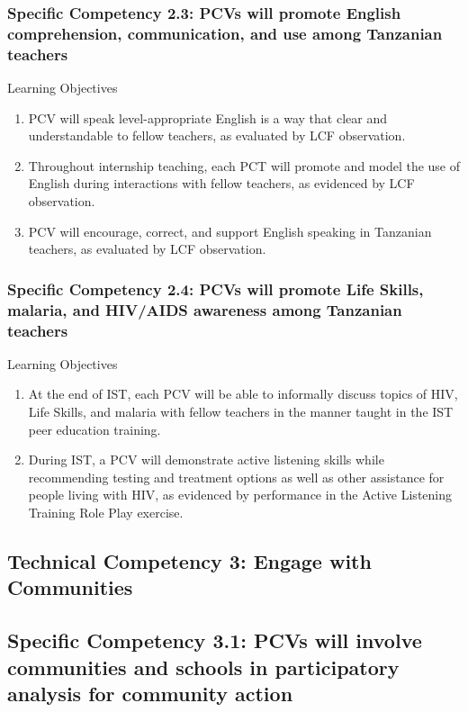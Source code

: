 \subsubsection*{Specific Competency 2.3: PCVs will promote English
comprehension, communication, and use among Tanzanian teachers}

Learning Objectives
\begin{enumerate}
\item PCV will speak level-appropriate English is a way that clear and understandable to fellow teachers, as evaluated by LCF observation.

\item Throughout internship teaching, each PCT will promote and model the
use of English during interactions with fellow teachers, as evidenced by
LCF observation.

\item PCV will encourage, correct, and support English speaking in Tanzanian teachers, as evaluated by LCF observation.
\end{enumerate}

\subsubsection*{Specific Competency 2.4: PCVs will promote Life Skills,
malaria, and HIV/AIDS awareness among Tanzanian
teachers}

Learning Objectives
\begin{enumerate}
\item At the end of IST, each PCV will be able to informally discuss topics of
HIV, Life Skills, and malaria with fellow teachers in the manner taught
in the IST peer education training.

\item During IST, a PCV will demonstrate active listening skills while recommending testing and treatment options as well as other assistance
for people living with HIV, as evidenced by performance in the Active
Listening Training Role Play exercise.
\end{enumerate}

\subsection*{Technical Competency 3: Engage with Communities}
\subsection*{Specific Competency 3.1: PCVs will involve communities and schools in participatory analysis for community
action}

